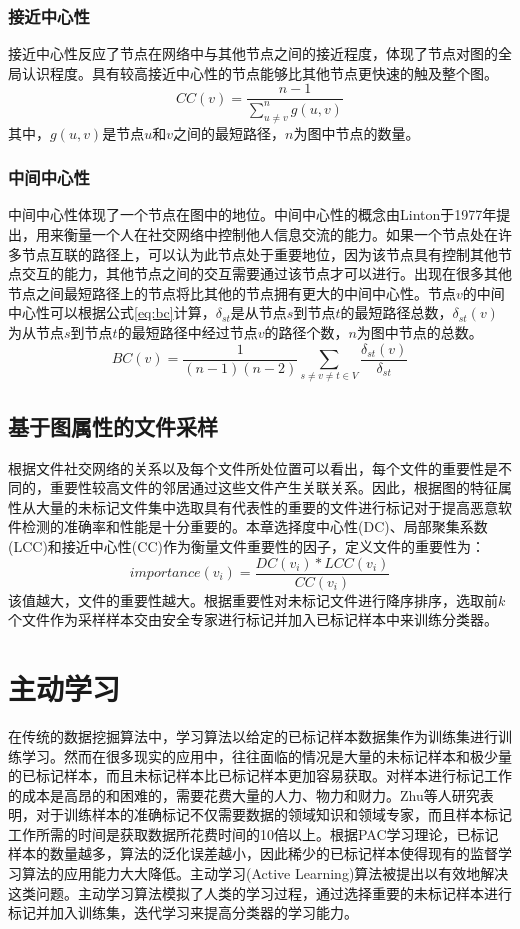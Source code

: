 \subsubsection{接近中心性}
接近中心性反应了节点在网络中与其他节点之间的接近程度，体现了节点对图的全局认识程度。具有较高接近中心性的节点能够比其他节点更快速的触及整个图。
\begin{equation}
CC(v)=\frac {n-1} {\sum_{u \neq v}^{n}g(u,v)}
\end{equation}
其中，$g(u,v)$是节点$u$和$v$之间的最短路径，$n$为图中节点的数量。

\subsubsection{中间中心性}
中间中心性体现了一个节点在图中的地位。中间中心性的概念由Linton于1977年提出，用来衡量一个人在社交网络中控制他人信息交流的能力\cite{freeman1977set}。如果一个节点处在许多节点互联的路径上，可以认为此节点处于重要地位，因为该节点具有控制其他节点交互的能力，其他节点之间的交互需要通过该节点才可以进行。出现在很多其他节点之间最短路径上的节点将比其他的节点拥有更大的中间中心性。节点$v$的中间中心性可以根据公式\ref{eq:bc}计算，$\delta_{st}$是从节点$s$到节点$t$的最短路径总数，$\delta_{st}(v)$为从节点$s$到节点$t$的最短路径中经过节点$v$的路径个数，$n$为图中节点的总数。
\begin{equation}
\label{eq:bc}
BC(v)=\frac {1} {(n-1)(n-2)}\sum_{s \neq v \neq t \in V} \frac {\delta_{st} (v)} {\delta_{st}}
\end{equation}

\subsection{基于图属性的文件采样}
根据文件社交网络的关系以及每个文件所处位置可以看出，每个文件的重要性是不同的，重要性较高文件的邻居通过这些文件产生关联关系。因此，根据图的特征属性从大量的未标记文件集中选取具有代表性的重要的文件进行标记对于提高恶意软件检测的准确率和性能是十分重要的。本章选择度中心性(DC)、局部聚集系数(LCC)和接近中心性(CC)作为衡量文件重要性的因子，定义文件的重要性为：
\begin{equation}
importance(v_{i}) = \frac {DC(v_{i}) * LCC(v_{i})} {CC(v_{i})}
\end{equation}
该值越大，文件的重要性越大。根据重要性对未标记文件进行降序排序，选取前$k$个文件作为采样样本交由安全专家进行标记并加入已标记样本中来训练分类器。

\section{主动学习}
在传统的数据挖掘算法中，学习算法以给定的已标记样本数据集作为训练集进行训练学习。然而在很多现实的应用中，往往面临的情况是大量的未标记样本和极少量的已标记样本，而且未标记样本比已标记样本更加容易获取。对样本进行标记工作的成本是高昂的和困难的，需要花费大量的人力、物力和财力。Zhu等人研究表明\cite{zhu2005semi}，对于训练样本的准确标记不仅需要数据的领域知识和领域专家，而且样本标记工作所需的时间是获取数据所花费时间的10倍以上。根据PAC学习理论，已标记样本的数量越多，算法的泛化误差越小，因此稀少的已标记样本使得现有的监督学习算法的应用能力大大降低。主动学习(Active Learning)算法被提出以有效地解决这类问题。主动学习算法模拟了人类的学习过程，通过选择重要的未标记样本进行标记并加入训练集，迭代学习来提高分类器的学习能力。
